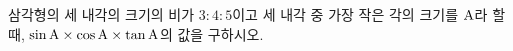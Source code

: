 삼각형의 세 내각의 크기의 비가 $3:4:5$이고 세 내각 중 가장 작은 각의 크기를 $\mathrm{A}$라 할 때, $\sin\mathrm{A}\times\cos\mathrm{A}\times\tan\mathrm{A}$의 값을 구하시오.
